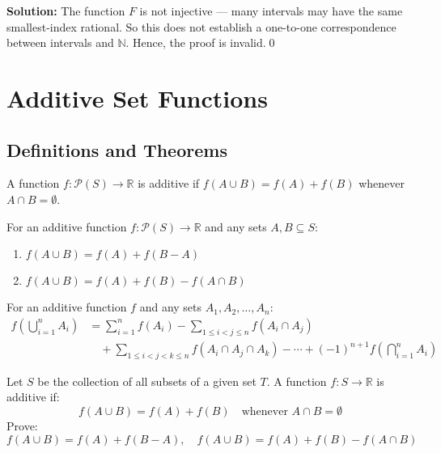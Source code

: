 \bigskip\noindent\textbf{Solution:}  
The function \( F \) is not injective — many intervals may have the same smallest-index rational.  
So this does not establish a one-to-one correspondence between intervals and \( \mathbb{N} \).  
Hence, the proof is invalid.\qed

\section{Additive Set Functions}

\subsection*{Definitions and Theorems}

\begin{definition}
A function $f: \mathcal{P}(S) \to \mathbb{R}$ is additive if $f(A \cup B) = f(A) + f(B)$ whenever $A \cap B = \emptyset$.
\end{definition}

\begin{theorem}
For an additive function $f: \mathcal{P}(S) \to \mathbb{R}$ and any sets $A, B \subseteq S$:
\begin{enumerate}
\item $f(A \cup B) = f(A) + f(B - A)$
\item $f(A \cup B) = f(A) + f(B) - f(A \cap B)$
\end{enumerate}
\end{theorem}

\begin{theorem}
For an additive function $f$ and any sets $A_1, A_2, \ldots, A_n$:
\begin{align*}
f\left(\bigcup_{i=1}^n A_i\right) &= \sum_{i=1}^n f(A_i) - \sum_{1 \leq i < j \leq n} f(A_i \cap A_j) \\
&\quad + \sum_{1 \leq i < j < k \leq n} f(A_i \cap A_j \cap A_k) - \cdots + (-1)^{n+1} f\left(\bigcap_{i=1}^n A_i\right)
\end{align*}
\end{theorem}



\begin{problembox}
Let \( S \) be the collection of all subsets of a given set \( T \).  
A function \( f: S \to \mathbb{R} \) is additive if:
\[
f(A \cup B) = f(A) + f(B)
\quad \text{whenever } A \cap B = \emptyset
\]  
Prove:  
\[
f(A \cup B) = f(A) + f(B - A), \quad 
f(A \cup B) = f(A) + f(B) - f(A \cap B)
\]
\end{problembox}

